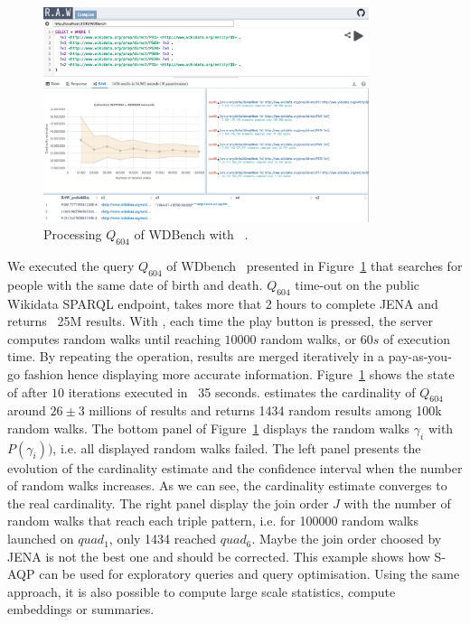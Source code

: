 \begin{figure}
   \centering
   \includegraphics[width=0.85\textwidth]{figures/raw_screenshot.png}
   \caption{\label{fig:raw_screenshot} Processing  $Q_{604}$ of
     WDBench\cite{angles2022wdbench} with ~\NAME.}
 \end{figure}


 We executed the query $Q_{604}$ of
 WDbench~\cite{angles2022wdbench} presented in
 Figure~\ref{fig:raw_screenshot} that searches for people with
 the same date of birth and death. $Q_{604}$ time-out on the public
 Wikidata SPARQL endpoint, takes more that  2 hours to complete
 JENA and returns ~25M results.
%
With \NAME,  each time the play button is pressed, the server computes random
 walks until reaching  $10 000$ random walks, or $60s$ of execution
 time. By repeating the operation, results are merged iteratively in a
 pay-as-you-go fashion hence displaying more accurate
 information. Figure~\ref{fig:raw_screenshot} shows the state of after
 $10$ iterations executed in ~35 seconds. \NAME estimates
 the cardinality of $Q_{604}$ around $26 \pm 3$ millions of results
 and returns 1434 random results among 100k random walks.
% 
 The bottom panel of Figure~\ref{fig:raw_screenshot} displays the
 random walks $\gamma_i$ with $P(\gamma_i))$, i.e. all displayed
 random walks failed.  The left panel presents the evolution of the
 cardinality estimate and the confidence interval when the number of
 random walks increases. As we can see, the cardinality estimate
 converges to the real cardinality.  The right panel display the join
 order $J$ with the number of random walks that reach each triple
 pattern, i.e. for 100000 random walks launched on $quad_1$, only 1434
 reached $quad_6$. Maybe the join order choosed by JENA is not the
 best one and should be corrected. This example shows how S-AQP can be
 used for exploratory queries and query optimisation. Using the same
 approach, it is also possible to compute large scale statistics,
 compute embeddings or summaries.



